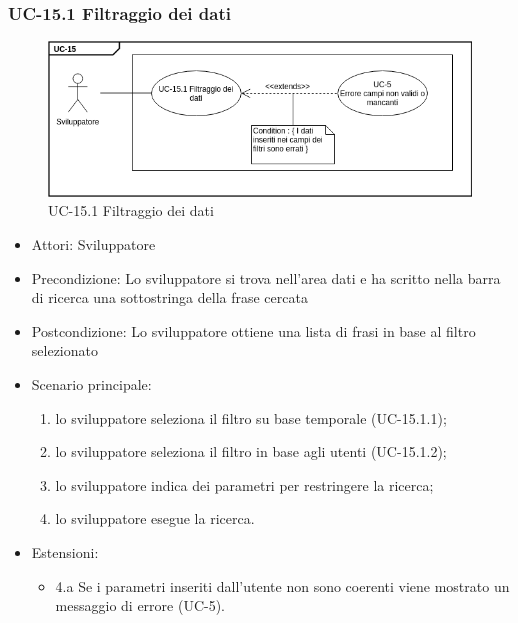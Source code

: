 	
	\subsubsection{UC-15.1 Filtraggio dei dati}	
		\begin{figure}[h]
			\centering
			\includegraphics[scale=0.7]{images/UC-15_1.png}
			\caption{UC-15.1 Filtraggio dei dati}
		\end{figure}	
		\begin{itemize}
			\item Attori: Sviluppatore
			\item Precondizione: Lo sviluppatore si trova nell'area dati e ha scritto nella barra di ricerca una sottostringa della frase cercata
			\item Postcondizione: Lo sviluppatore ottiene una lista di frasi in base al filtro selezionato
			\item Scenario principale:
				\begin{enumerate}
					\item lo sviluppatore seleziona il filtro su base temporale (UC-15.1.1);
					\item lo sviluppatore seleziona il filtro in base agli utenti (UC-15.1.2);
					\item lo sviluppatore indica dei parametri per restringere la ricerca;
					\item lo sviluppatore esegue la ricerca.
				\end{enumerate}	
			\item Estensioni:
				\begin{itemize}
					\item 4.a Se i parametri inseriti dall'utente non sono coerenti viene mostrato un messaggio di errore (UC-5).
				\end{itemize}		
		\end{itemize}
	
	
